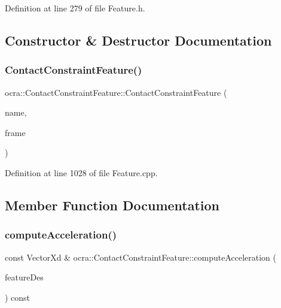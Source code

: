 Definition at line 279 of file Feature.\+h.



\subsection{Constructor \& Destructor Documentation}
\hypertarget{classocra_1_1ContactConstraintFeature_a2e4c6265bd194309b5e2304260d53bec}{}\label{classocra_1_1ContactConstraintFeature_a2e4c6265bd194309b5e2304260d53bec} 
\subsubsection{\texorpdfstring{Contact\+Constraint\+Feature()}{ContactConstraintFeature()}}
{\footnotesize\ttfamily ocra\+::\+Contact\+Constraint\+Feature\+::\+Contact\+Constraint\+Feature (\begin{DoxyParamCaption}\item[{const std\+::string \&}]{name,  }\item[{Control\+Frame\+::\+Ptr}]{frame }\end{DoxyParamCaption})}



Definition at line 1028 of file Feature.\+cpp.



\subsection{Member Function Documentation}
\hypertarget{classocra_1_1ContactConstraintFeature_a81aeb9d50b198c49d0868ba8321bcfd7}{}\label{classocra_1_1ContactConstraintFeature_a81aeb9d50b198c49d0868ba8321bcfd7} 
\subsubsection{\texorpdfstring{compute\+Acceleration()}{computeAcceleration()}\hspace{0.1cm}{\footnotesize\ttfamily [1/2]}}
{\footnotesize\ttfamily const Vector\+Xd \& ocra\+::\+Contact\+Constraint\+Feature\+::compute\+Acceleration (\begin{DoxyParamCaption}\item[{const \hyperlink{classocra_1_1Feature}{Feature} \&}]{feature\+Des }\end{DoxyParamCaption}) const\hspace{0.3cm}{\ttfamily [virtual]}}



